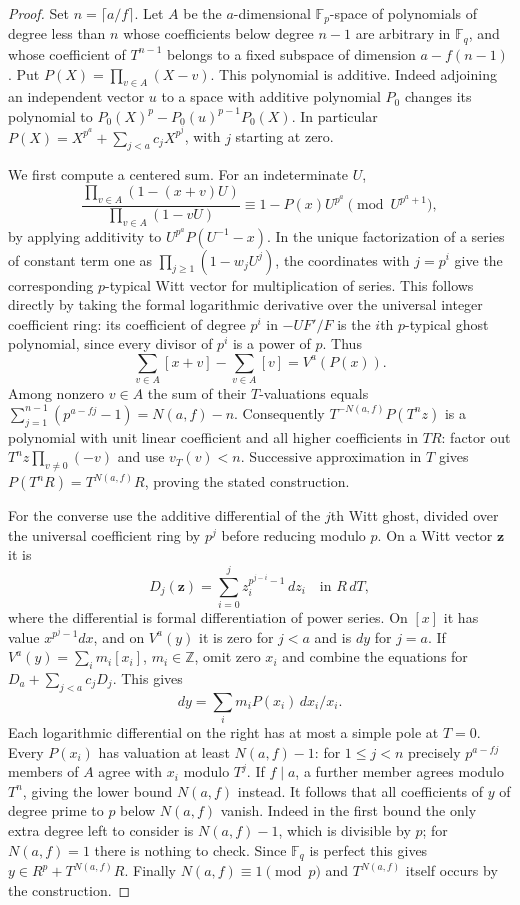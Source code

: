 \documentclass[11pt,letterpaper]{article}
\theoremstyle{definition}
\numberwithin{equation}{section}
\begin{document}
\begin{proof}
Set $n=\lceil a/f\rceil$. Let $A$ be the $a$-dimensional
$\mathbb F_p$-space of polynomials of degree less than $n$ whose
coefficients below degree $n-1$ are arbitrary in $\mathbb F_q$,
and whose coefficient of $T^{n-1}$ belongs to a fixed subspace of
dimension $a-f(n-1)$. Put $P(X)=\prod_{v\in A}(X-v)$. This
polynomial is additive. Indeed adjoining an independent vector $u$
to a space with additive polynomial $P_0$ changes its polynomial to
$P_0(X)^p-P_0(u)^{p-1}P_0(X)$. In particular
$P(X)=X^{p^a}+\sum_{j<a}c_jX^{p^j}$, with $j$ starting at zero.

We first compute a centered sum. For an indeterminate $U$,
\[
 \frac{\prod_{v\in A}(1-(x+v)U)}{\prod_{v\in A}(1-vU)}
 \equiv 1-P(x)U^{p^a}\pmod{U^{p^a+1}},
\]
by applying additivity to $U^{p^a}P(U^{-1}-x)$.
In the unique factorization of a series of constant term one as
$\prod_{j\ge1}(1-w_jU^j)$, the coordinates with $j=p^i$ give
the corresponding $p$-typical Witt vector for multiplication of
series. This follows directly by taking the formal logarithmic
derivative over the universal integer coefficient ring: its
coefficient of degree $p^i$ in $-UF'/F$ is the $i$th $p$-typical
ghost polynomial, since every divisor of $p^i$ is a power of $p$.
Thus
\[
                 \sum_{v\in A}[x+v]-\sum_{v\in A}[v]=V^a(P(x)).
\]
Among nonzero $v\in A$ the sum of their $T$-valuations equals
$\sum_{j=1}^{n-1}(p^{a-fj}-1)=N(a,f)-n$.
Consequently $T^{-N(a,f)}P(T^n z)$ is a polynomial with unit
linear coefficient and all higher coefficients in $TR$: factor out
$T^n z\prod_{v\ne0}(-v)$ and use $v_T(v)<n$.
Successive approximation in $T$ gives
$P(T^nR)=T^{N(a,f)}R$, proving the stated construction.

For the converse use the additive differential of the $j$th Witt
ghost, divided over the universal coefficient ring by $p^j$ before
reducing modulo $p$. On a Witt vector $\mathbf z$ it is
\[
     D_j(\mathbf z)=\sum_{i=0}^j z_i^{p^{j-i}-1}\,dz_i
                       \quad\text{in }R\,dT ,
\]
where the differential is formal differentiation of power series.
On $[x]$ it has value $x^{p^j-1}dx$, and on $V^a(y)$ it is zero
for $j<a$ and is $dy$ for $j=a$. If
$V^a(y)=\sum_i m_i[x_i]$, $m_i\in\mathbb Z$, omit zero $x_i$
and combine the equations for $D_a+\sum_{j<a}c_jD_j$. This gives
\[
                         dy=\sum_i m_i P(x_i)\,dx_i/x_i .
\]
Each logarithmic differential on the right has at most a simple
pole at $T=0$. Every $P(x_i)$ has valuation at least $N(a,f)-1$:
for $1\le j<n$ precisely $p^{a-fj}$ members of $A$ agree with
$x_i$ modulo $T^j$. If $f\mid a$, a further member agrees modulo
$T^n$, giving the lower bound $N(a,f)$ instead. It follows that
all coefficients of $y$ of degree prime to $p$ below $N(a,f)$
vanish. Indeed in the first bound the only extra degree left to
consider is $N(a,f)-1$, which is divisible by $p$; for $N(a,f)=1$
there is nothing to check. Since $\mathbb F_q$ is perfect this gives
$y\in R^p+T^{N(a,f)}R$. Finally $N(a,f)\equiv1\pmod p$ and
$T^{N(a,f)}$ itself occurs by the construction.
\end{proof}
\end{document}
